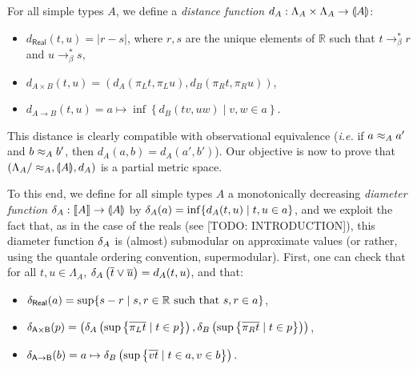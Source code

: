 For all simple types $A$, we define a \emph{distance function} $d_A : \Lambda_A \times \Lambda_A \to \llparenthesis A \rrparenthesis$:
\begin{itemize}
\item $d_\mathsf{Real}(t,u) = \left\vert r-s \right\vert$, where $r,s$ are the unique elements of $\mathbb{R}$ such that $t \to_\beta^* r$ and $u \to_\beta^* s$,
\item $d_{A \times B}(t,u) = (d_A(\pi_L t, \pi_L u), d_B(\pi_R t, \pi_R u))$,
\item $d_{A \to B}(t,u) = a \mapsto \inf \left\{ d_B(tv, uw) \mid v,w \in a \right\}$.
\end{itemize}

This distance is clearly compatible with observational equivalence (\textit{i.e.} if $a \approx_A a'$ and $b \approx_A b'$, then $d_A(a,b) = d_A(a',b')$). Our objective is now to prove that $\left(\Lambda_A/\approx_A, \llparenthesis A \rrparenthesis, d_A\right)$ is a partial metric space.


To this end, we define for all simple types $A$ a monotonically decreasing \emph{diameter function} $\delta_A : \llbracket A \rrbracket \to \llparenthesis A \rrparenthesis$ by $\delta_A(a) = \inf \{ d_A(t,u) \mid t,u \in a \}$, and we exploit the fact that, as in the case of the reals (see [TODO: INTRODUCTION]), this diameter function $\delta_{A}$ is (almost) submodular on approximate values (or rather, using the quantale ordering convention, supermodular). First, one can check that for all $t,u \in \Lambda_A$, $\delta_A\left(\overline{t} \vee \overline{u}\right) = d_A(t,u)$, and that:
\begin{itemize}
\item $\delta_\mathsf{Real}(a) = \sup\{s-r \mid s,r \in \mathbb{R} \text{ such that } s,r \in a\}$,
\item $\delta_\mathsf{A \times B}(p) = \left(\delta_A\left(\sup\left\{\overline{\pi_L t} \mid t \in p\right\}\right), \delta_B\left(\sup\left\{\overline{\pi_R t} \mid t \in p\right\}\right)\right)$,
\item $\delta_\mathsf{A \to B}(b) = a \mapsto \delta_B\left(\sup\left\{\overline{vt} \mid t\in a, v \in b\right\}\right).$
\end{itemize}

